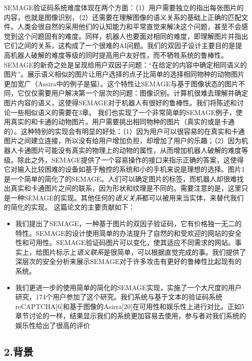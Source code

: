 SEMAGE验证码系统难度体现在两个方面：（1）用户需要独立的指出每张图片的内容，也就是图像识别，（2）还需要在理解图像的语义关系的基础上正确的匹配文件。人类会很自然的采用他们的认知能力和平常直觉来解决这个问题，甚至不会感觉到这个问题固有的难度。同样，机器人也要面对相同的难度，即理解图片并指出它们之间的关系，这构成了一个很难的AI问题。我们的双因子设计主要目的是提高机器人破解的难度等级的同时提高用户友好性，而不牺牲系统的鲁棒性。
SEMAGE的新奇之处是呈现给用户双因子问题：``在给定的内容中确定相同语义的图片''。展示语义相似的图片让用户选择的点子比简单的选择相同物种的动物图片更加宽广（Assira中的例子是猫）。这个特性让SEMAGE与基于图像状态的图片不同，它仅仅需要用户解决第一个层次的问题：图像识别。计算机很难去理解并确定图片内容的语义，这使得SEMAGE对于机器人有很好的鲁棒性。我们将陈述和讨论一些相似语义的需要在3章。
我们也实现了一个非常简单的SEMAGE例子，使用真实的和卡通的动物图片。用户需要挑出相同物种的图片（真实的或是卡通的）。这种特别的实现会有明显的好处：（1）因为用户可以很容易的在真实和卡通图片之间建立连接，所以没有给用户增加负担，却增加了用户的乐趣；（2）因为机器人卡通图片可能没有真实的物理上的动物的属性，从而增加机器人破解的难度等级。除此之外，SEMAGE提供了一个容易操作的接口来指示正确的答案，这使得它对输入比较困难的设备如基于触控的系统和小的手机来说是理想的选择。图片1是一个简单的简化了的SEMAGE。人们可以确定图片的标签，而机器人却很难找出真实和卡通图片之间的联系，因为形状和纹理是不同的。需要注意的是，这里只是一种SEMAGE的实现。其他任何的\emph{语义关系}都可以被用来当实体，来替代我们的简化的实现。
这篇论文的主要贡献如下：

\begin{itemize}
\tightlist
\item
  我们提出了SEMAGE，一种基于图片的双因子验证码，它有价格独一无二的特性。SEMAGE的设计使用简单的办法提升了自然的和受欢迎的网站的安全性和可用性。SEMAGE验证码图片可以变化，使其适应不同需求的网站。事实上，给图片标示上\emph{语义联系}是很简单，可以根据直觉完成的事。我们提供了深层次的安全分析来展示SEMAGE对于许多攻击有更好的鲁棒性比起现有的系统。
\item
  我们更进一步的使用简单的简化的SEMAGE实现，实施了一个大尺度的用户研究，174个用户参加了这个研究。我们系统与基于文本的验证码系统reCAPTCHA{[}6{]}和基于图像的Asirra{[}20{]}在可用性和娱乐性上进行对比。正如5章节讨论的一样，结果显示我们的系统更加容易去使用，参与者对我们系统的娱乐性给出了很高的评价
\end{itemize}

\subsection{2.背景}\label{ux80ccux666f}

